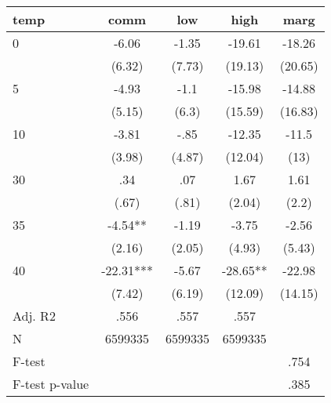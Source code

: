\documentclass[]{article}
\begin{document}
\begin{tabular}{lcccc} \hline
temp & comm & low & high & marg \\ \hline
0 & -6.06 & -1.35 & -19.61 & -18.26 \\
 & (6.32) & (7.73) & (19.13) & (20.65) \\
5 & -4.93 & -1.1 & -15.98 & -14.88 \\
 & (5.15) & (6.3) & (15.59) & (16.83) \\
10 & -3.81 & -.85 & -12.35 & -11.5 \\
 & (3.98) & (4.87) & (12.04) & (13) \\
30 & .34 & .07 & 1.67 & 1.61 \\
 & (.67) & (.81) & (2.04) & (2.2) \\
35 & -4.54** & -1.19 & -3.75 & -2.56 \\
 & (2.16) & (2.05) & (4.93) & (5.43) \\
40 & -22.31*** & -5.67 & -28.65** & -22.98 \\
 & (7.42) & (6.19) & (12.09) & (14.15) \\
\hline Adj. R2 & .556 & .557 & .557 &  \\
N & 6599335 & 6599335 & 6599335 &  \\
F-test &  &  &  & .754 \\
 F-test p-value &  &  &  & .385 \\ \hline
\end{tabular}
\end{document}
